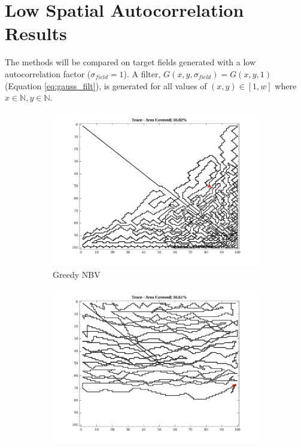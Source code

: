 \FloatBarrier
\clearpage

\section{Low Spatial Autocorrelation Results}
The methods will be compared on target fields generated with a low autocorrelation factor ($\sigma_{field}=1$). A filter, $G(x,y,\sigma_{field}) = G(x,y,1)$ (Equation \ref{eq:gauss_filt}), is generated for all values of $(x,y) \in [1, w]$ where $x \in \mathbb{N}, y \in \mathbb{N}$.

\begin{figure}[htb!]
    \centering
    \begin{subfigure}[t]{0.25\textwidth}
        \centering
        \includegraphics[width=\linewidth]{figures/path_greedy_30p_100x100_sf_1_seed_2.png}
        \captionsetup{skip=0.20\baselineskip,size=footnotesize}
        \caption{Greedy NBV}
    \end{subfigure}%
    \begin{subfigure}[t]{0.25\textwidth}
        \centering
        \includegraphics[width=\linewidth]{figures/path_mc_30p_100x100_sf_1_seed_2.png}

\end{subfigure}
\end{figure}

